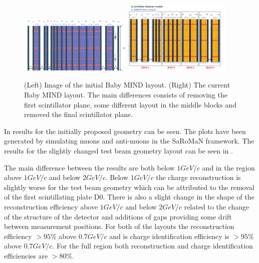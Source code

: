 \begin{figure}[h!]
\centering
\includegraphics[width=0.48\textwidth]{figures/oldStudies/oldMIND.png}
\includegraphics[width=0.46\textwidth]{figures/MIND.jpeg}
\caption{(Left) Image of the initial Baby MIND layout. (Right) The current Baby MIND layout. The main differences consists of removing the first scintillator plane, some different layout in the middle blocks and removed the final scintillator plane.}
\label{fig:oldMIND}
\end{figure}

In  results for the initially proposed geometry can be seen. The plots have been generated by simulating muons and anti-muons in the SaRoMaN framework. The results for the slightly changed test beam geometry layout can be seen in  . 

The main difference between the results are both below $1 GeV/c$ and in the region above $1 GeV/c$ and below $2 GeV/c$. Below $1 GeV/c$ the charge reconstruction is slightly worse for the test beam geometry which can be attributed to the removal of the first scintillating plate D0. There is also a slight change in the shape of the reconstruction efficiency above $1 GeV/c$ and below $2 GeV/c$ related to the change of the structure of the detector and additions of gaps providing some drift between measurement positions. For both of the layouts the reconstruction efficiency $> 95\%$ above $0.7 GeV/c$ and  is charge identification efficiency is $> 95\%$ above $0.7 GeV/c$. For the full region both reconstruction and charge identification efficiencies are $> 80\% $. 


